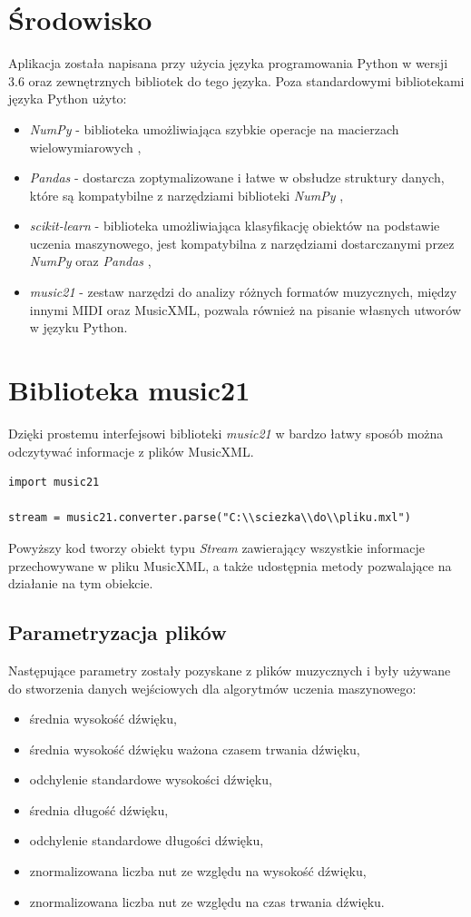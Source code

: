 \documentclass[printmode, eng, openany]{mgr}
\newcommand\tab[1][1cm]{\hspace*{#1}}
\begin{document}
\section{Środowisko}
\tab Aplikacja została napisana przy użycia języka programowania Python w wersji 3.6 oraz zewnętrznych bibliotek do tego języka. Poza standardowymi bibliotekami języka Python użyto:
\begin{itemize}
\item \textit{NumPy} - biblioteka umożliwiająca szybkie operacje na macierzach wielowymiarowych \cite{numpy},
\item \textit{Pandas} - dostarcza zoptymalizowane i łatwe w obsłudze struktury danych, które są kompatybilne z narzędziami biblioteki \textit{NumPy} \cite{pandas},
\item \textit{scikit-learn} - biblioteka umożliwiająca klasyfikację obiektów na podstawie uczenia maszynowego, jest kompatybilna z narzędziami dostarczanymi przez \textit{NumPy} oraz \textit{Pandas} \cite{sci},
\item \textit{music21} - zestaw narzędzi do analizy różnych formatów muzycznych, między innymi MIDI oraz MusicXML, pozwala również na pisanie własnych utworów w języku Python. \cite{m21}
\end{itemize}
\section{Biblioteka music21}
\tab Dzięki prostemu interfejsowi biblioteki \textit{music21} w bardzo łatwy sposób można odczytywać informacje z plików MusicXML.
\begin{lstlisting}
import music21

stream = music21.converter.parse("C:\\sciezka\\do\\pliku.mxl")
\end{lstlisting}
\tab Powyższy kod tworzy obiekt typu \textit{Stream} zawierający wszystkie informacje przechowywane w pliku MusicXML, a także udostępnia metody pozwalające na działanie na tym obiekcie. 
\subsection{Parametryzacja plików}
\tab Następujące parametry zostały pozyskane z plików muzycznych i były używane do stworzenia danych wejściowych dla algorytmów uczenia maszynowego:
\begin{itemize}
\item średnia wysokość dźwięku,
\item średnia wysokość dźwięku ważona czasem trwania dźwięku,
\item odchylenie standardowe wysokości dźwięku,
\item średnia długość dźwięku,
\item odchylenie standardowe długości dźwięku,
\item znormalizowana liczba nut ze względu na wysokość dźwięku,
\item znormalizowana liczba nut ze względu na czas trwania dźwięku.
\end{itemize}
\end{document}
